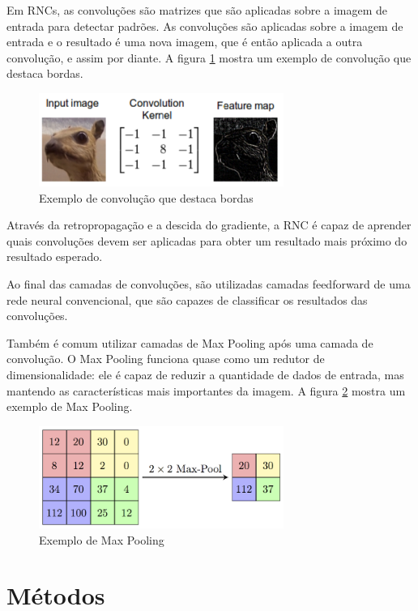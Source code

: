 \documentclass[conference]{IEEEtran}
\begin{document}
Em RNCs, as convoluções são matrizes que são aplicadas sobre a imagem de entrada para detectar padrões. As convoluções são aplicadas sobre a imagem de entrada e o resultado é uma nova imagem, que é então aplicada a outra convolução, e assim por diante. A figura \ref{fig:conv} mostra um exemplo de convolução que destaca bordas.


\begin{figure}[H]
\centering
\includegraphics[width=8cm]{img/conv.png}
\caption{Exemplo de convolução que destaca bordas}
\label{fig:conv}
\end{figure}

Através da retropropagação e a descida do gradiente, a RNC é capaz de aprender quais convoluções devem ser aplicadas para obter um resultado mais próximo do resultado esperado.

Ao final das camadas de convoluções, são utilizadas camadas feedforward de uma rede neural convencional, que são capazes de classificar os resultados das convoluções.

Também é comum utilizar camadas de Max Pooling após uma camada de convolução. O Max Pooling funciona quase como um redutor de dimensionalidade: ele é capaz de reduzir a quantidade de dados de entrada, mas mantendo as características mais importantes da imagem. A figura \ref{fig:pool} mostra um exemplo de Max Pooling.

\begin{figure}[H]
\centering
\includegraphics[width=8cm]{img/pool.png}
\caption{Exemplo de Max Pooling}
\label{fig:pool}
\end{figure}

\section{Métodos}
\end{document}
